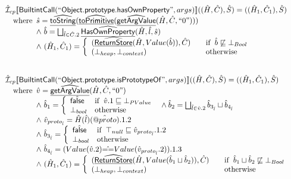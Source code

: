 \[\begin{array}{l}
  
\aI _{cp}\lbr \SF{BuiltintCall}(``\SF{Object.prototype.hasOwnProperty}",args)\rbr((\hat{H},\hat{C}), \hat{S})  = ((\hat{H}_1, \hat{C}_1), \hat{S})\\
\quad\wherec{
  \hat{s} = \ahf{toString}(\ahf{toPrimitive}(\ahf{getArgValue}(\hat{H}, \hat{C}, ``0")))\\
  \land\ \hat{b} = \bigsqcup_{\hat{l} \in \hat{C}.2} \ahf{HasOwnProperty}(\hat{H}, \hat{l}, \hat{s})\\
  \land\ (\hat{H}_1, \hat{C}_1) = 
    \left\{\begin{array}{l@{\quad\quad}l}
      (\ahf{ReturnStore}(\hat{H}, Value(\hat{b})), \hat{C})
      & \ifc{\hat{b} \not\sqsubseteq \bot_{Bool}}\\
      (\bot_{heap}, \bot_{context}) & \owc \\
    \end{array}\right.\\
  }\\
\\\\



\aI _{cp}\lbr \SF{BuiltintCall}(``\SF{Object.prototype.isPrototypeOf}",args)\rbr((\hat{H},\hat{C}), \hat{S})
  = ((\hat{H}_1, \hat{C}_1), \hat{S})\\
\quad\wherec{
  \hat{v} = \ahf{getArgValue}(\hat{H}, \hat{C}, ``0")\\
  \land\ \hat{b}_1 = \left\{\begin{array}{ll}
      \afalse & \ifc{\hat{v}.1 \sqsubseteq \bot_{PValue}}\\
      \bot_{bool} & \owc
    \end{array}\right.
  \land \hat{b}_2 = \bigsqcup_{\hat{l} \in \hat{v}.2} \hat{b}_{3_{\hat{l}}} \sqcup \hat{b}_{4_{\hat{l}}}\\
  \land\ \hat{v}_{proto_{\hat{l}}} = \hat{H}(\hat{l})(\avarprop{proto}).1.2\\
  \land\ \hat{b}_{3_{\hat{l}}} = \left\{\begin{array}{ll}
      \afalse & \ifc{\top_{null} \sqsubseteq \hat{v}_{proto_{\hat{l}}}.1.2}\\
      \bot_{bool} & \owc
    \end{array}\right.\\
  \land\ \hat{b}_{4_{\hat{l}}} = (Value(\hat{v}.2) \hat{==} Value(\hat{v}_{proto_{\hat{l}}}.2)).1.3\\
  \land\ (\hat{H}_1, \hat{C}_1) = 
    \left\{\begin{array}{l@{\quad\quad}l}
      (\ahf{ReturnStore}(\hat{H}, Value(\hat{b}_1 \sqcup \hat{b}_2)), \hat{C})
      & \ifc{\hat{b}_1 \sqcup \hat{b}_2 \not\sqsubseteq \bot_{Bool}}\\
      (\bot_{heap}, \bot_{context}) & \owc \\
    \end{array}\right.\\
  }\\
\\\\ 
\end{array}
\]

